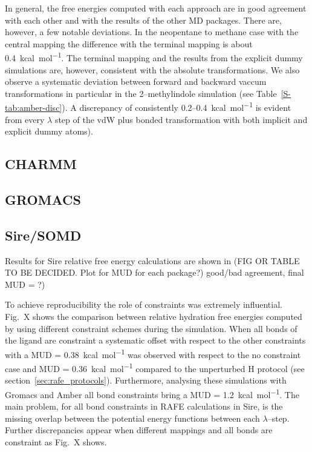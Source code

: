 \documentclass[journal=jctcce,manuscript=article]{achemso}
\begin{document}
In general, the free energies computed with each approach are in good agreement with each other and with the results of the other MD packages.  There are, however, a few notable deviations.  In the neopentane to methane case with the central mapping the difference with the terminal mapping is about \SI{0.4}{kcal.mol^{-1}}.  The terminal mapping and the results from the explicit dummy simulations are, however, consistent with the absolute transformations.  We also observe a systematic deviation between forward and backward vaccum transformations in particular in the 2--methylindole simulation (see Table~\ref{S-tab:amber-disc}).
A discrepancy of consistently 0.2--\SI{0.4}{kcal.mol^{-1}} is evident from every $\lambda$ step of the vdW plus bonded transformation with both implicit and explicit dummy atoms).

\subsection{CHARMM}
\label{sec:charmm-results}



\subsection{GROMACS}
\label{sec:gromacs-results}


\subsection{Sire/SOMD}
\label{sec:somd-results}

Results for Sire relative free energy calculations are shown in (FIG OR TABLE
TO BE DECIDED. Plot for MUD for each package?) good/bad agreement, final MUD =
?)

To achieve reproducibility the role of constraints was extremely
influential.  Fig.\ X shows the comparison between relative hydration
free energies computed by using different constraint schemes during
the simulation. When all bonds of the ligand are constraint a
systematic offset with respect to the other constraints with a MUD =
\SI{0.38}{kcal.mol^{-1}} was observed with respect to the no
constraint case and MUD = \SI{0.36}{kcal.mol^{-1}} compared to the
unperturbed H protocol (see section~\ref{sec:rafe_protocols}).
Furthermore, analysing these simulations with Gromacs and Amber all
bond constraints bring a MUD = \SI{1.2}{kcal.mol^{-1}}. The main
problem, for all bond constraints in RAFE calculations in Sire, is the
missing overlap between the potential energy functions between each
$\lambda$--step.  Further discrepancies appear when different
mappings and all bonds are constraint as Fig.\ X shows.
\end{document}
